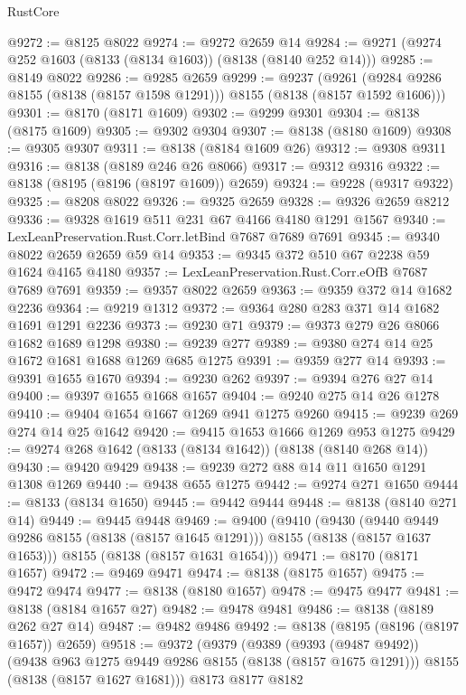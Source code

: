 \begin{lexlean}{RustCore}
\begin{coremodule}
@9272 := @8125 @8022
@9274 := @9272 @2659 @14
@9284 := @9271 (@9274 @252 @1603 (@8133 (@8134 @1603)) (@8138 (@8140 @252 @14)))
@9285 := @8149 @8022
@9286 := @9285 @2659
@9299 := @9237
    (@9261 (@9284 @9286 @8155 (@8138 (@8157 @1598 @1291))) @8155 (@8138 (@8157 @1592 @1606)))
@9301 := @8170 (@8171 @1609)
@9302 := @9299 @9301
@9304 := @8138 (@8175 @1609)
@9305 := @9302 @9304
@9307 := @8138 (@8180 @1609)
@9308 := @9305 @9307
@9311 := @8138 (@8184 @1609 @26)
@9312 := @9308 @9311
@9316 := @8138 (@8189 @246 @26 @8066)
@9317 := @9312 @9316
@9322 := @8138 (@8195 (@8196 (@8197 @1609)) @2659)
@9324 := @9228 (@9317 @9322)
@9325 := @8208 @8022
@9326 := @9325 @2659
@9328 := @9326 @2659 @8212
@9336 := @9328 @1619 @511 @231 @67 @4166 @4180 @1291 @1567
@9340 := LexLeanPreservation.Rust.Corr.letBind @7687 @7689 @7691
@9345 := @9340 @8022 @2659 @2659 @59 @14
@9353 := @9345 @372 @510 @67 @2238 @59 @1624 @4165 @4180
@9357 := LexLeanPreservation.Rust.Corr.eOfB @7687 @7689 @7691
@9359 := @9357 @8022 @2659
@9363 := @9359 @372 @14 @1682 @2236
@9364 := @9219 @1312
@9372 := @9364 @280 @283 @371 @14 @1682 @1691 @1291 @2236
@9373 := @9230 @71
@9379 := @9373 @279 @26 @8066 @1682 @1689 @1298
@9380 := @9239 @277
@9389 := @9380 @274 @14 @25 @1672 @1681 @1688 @1269 @685 @1275
@9391 := @9359 @277 @14
@9393 := @9391 @1655 @1670
@9394 := @9230 @262
@9397 := @9394 @276 @27 @14
@9400 := @9397 @1655 @1668 @1657
@9404 := @9240 @275 @14 @26 @1278
@9410 := @9404 @1654 @1667 @1269 @941 @1275 @9260
@9415 := @9239 @269 @274 @14 @25 @1642
@9420 := @9415 @1653 @1666 @1269 @953 @1275
@9429 := @9274 @268 @1642 (@8133 (@8134 @1642)) (@8138 (@8140 @268 @14))
@9430 := @9420 @9429
@9438 := @9239 @272 @88 @14 @11 @1650 @1291 @1308 @1269
@9440 := @9438 @655 @1275
@9442 := @9274 @271 @1650
@9444 := @8133 (@8134 @1650)
@9445 := @9442 @9444
@9448 := @8138 (@8140 @271 @14)
@9449 := @9445 @9448
@9469 := @9400
    (@9410
      (@9430
        (@9440 @9449 @9286 @8155 (@8138 (@8157 @1645 @1291)))
        @8155
        (@8138 (@8157 @1637 @1653)))
      @8155
      (@8138 (@8157 @1631 @1654)))
@9471 := @8170 (@8171 @1657)
@9472 := @9469 @9471
@9474 := @8138 (@8175 @1657)
@9475 := @9472 @9474
@9477 := @8138 (@8180 @1657)
@9478 := @9475 @9477
@9481 := @8138 (@8184 @1657 @27)
@9482 := @9478 @9481
@9486 := @8138 (@8189 @262 @27 @14)
@9487 := @9482 @9486
@9492 := @8138 (@8195 (@8196 (@8197 @1657)) @2659)
@9518 := @9372
    (@9379
      (@9389
        (@9393 (@9487 @9492))
        (@9438 @963 @1275 @9449 @9286 @8155 (@8138 (@8157 @1675 @1291)))
        @8155
        (@8138 (@8157 @1627 @1681)))
      @8173
      @8177
      @8182

\end{coremodule}
\end{lexlean}
